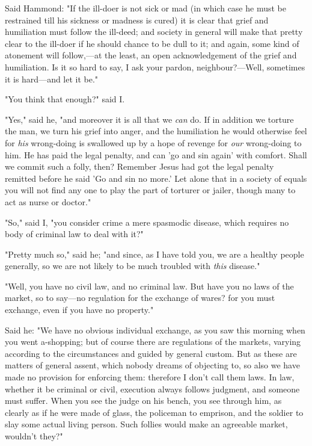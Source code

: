 Said Hammond: "If the ill-doer is not sick or mad (in which case he must
be restrained till his sickness or madness is cured) it is clear that
grief and humiliation must follow the ill-deed; and society in general
will make that pretty clear to the ill-doer if he should chance to be
dull to it; and again, some kind of atonement will follow,---at the
least, an open acknowledgement of the grief and humiliation. Is it so
hard to say, I ask your pardon, neighbour?---Well, sometimes it is
hard---and let it be."

"You think that enough?" said I.

"Yes," said he, "and moreover it is all that we \emph{can} do. If in
addition we torture the man, we turn his grief into anger, and the
humiliation he would otherwise feel for \emph{his} wrong-doing is
swallowed up by a hope of revenge for \emph{our} wrong-doing to him. He
has paid the legal penalty, and can 'go and sin again' with comfort.
Shall we commit such a folly, then? Remember Jesus had got the legal
penalty remitted before he said 'Go and sin no more.' Let alone that in
a society of equals you will not find any one to play the part of
torturer or jailer, though many to act as nurse or doctor."

"So," said I, "you consider crime a mere spasmodic disease, which
requires no body of criminal law to deal with it?"

"Pretty much so," said he; "and since, as I have told you, we are a
healthy people generally, so we are not likely to be much troubled with
\emph{this} disease."

"Well, you have no civil law, and no criminal law. But have you no laws
of the market, so to say---no regulation for the exchange of wares? for
you must exchange, even if you have no property."

Said he: "We have no obvious individual exchange, as you saw this
morning when you went a-shopping; but of course there are regulations of
the markets, varying according to the circumstances and guided by
general custom. But as these are matters of general assent, which nobody
dreams of objecting to, so also we have made no provision for enforcing
them: therefore I don't call them laws. In law, whether it be criminal
or civil, execution always follows judgment, and someone must suffer.
When you see the judge on his bench, you see through him, as clearly as
if he were made of glass, the policeman to emprison, and the soldier to
slay some actual living person. Such follies would make an agreeable
market, wouldn't they?"


